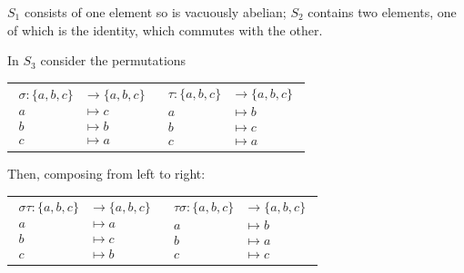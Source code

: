 \documentclass[../UNABRIDGEDalgebraNotesMSRI-UP2016.tex]{subfiles}
\begin{document}
\begin{frame}
$S_1$ consists of one element so is vacuously abelian; $S_2$ contains two elements, one of which is the identity, which commutes with the other.

\smallGap
In $S_3$ consider the permutations
\begin{tabular}{p{}p{}}
\vspace{-0.75pc}
{\begin{align*}
\sigma: \{a,b,c\} &\to \{a,b,c\} \\
	a &\mapsto c \\
	b &\mapsto b \\
	c &\mapsto a
\end{align*}
} & \vspace{-0.75pc}
{\begin{align*}
\tau: \{a,b,c\} &\to \{a,b,c\} \\
	a &\mapsto b\\
	b &\mapsto c\\
	c &\mapsto a
\end{align*}
}
\end{tabular}

\vspace{-0.75pc}
Then, composing from left to right:
\begin{tabular}{p{}p{}}
\vspace{-0.75pc}
{\begin{align*}
\sigma\tau: \{a,b,c\} &\to \{a,b,c\} \\
	a &\mapsto a \\
	b &\mapsto c \\
	c &\mapsto b
\end{align*}
} & \vspace{-0.75pc}
{\begin{align*}
\tau\sigma: \{a,b,c\} &\to \{a,b,c\} \\
	a &\mapsto b \\
	b &\mapsto a \\
	c &\mapsto c
\end{align*}
}
\end{tabular}
\end{frame}
\end{document}
